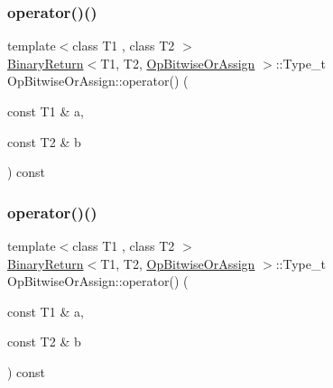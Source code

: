 \subsubsection{\texorpdfstring{operator()()}{operator()()}\hspace{0.1cm}{\footnotesize\ttfamily [1/3]}}
{\footnotesize\ttfamily template$<$class T1 , class T2 $>$ \\
\mbox{\hyperlink{structBinaryReturn}{Binary\+Return}}$<$T1, T2, \mbox{\hyperlink{structOpBitwiseOrAssign}{Op\+Bitwise\+Or\+Assign}} $>$\+::Type\+\_\+t Op\+Bitwise\+Or\+Assign\+::operator() (\begin{DoxyParamCaption}\item[{const T1 \&}]{a,  }\item[{const T2 \&}]{b }\end{DoxyParamCaption}) const\hspace{0.3cm}{\ttfamily [inline]}}

\mbox{\label{structOpBitwiseOrAssign_abdf5c9f46dce33611878cf271e3b7a09}} 
\subsubsection{\texorpdfstring{operator()()}{operator()()}\hspace{0.1cm}{\footnotesize\ttfamily [2/3]}}
{\footnotesize\ttfamily template$<$class T1 , class T2 $>$ \\
\mbox{\hyperlink{structBinaryReturn}{Binary\+Return}}$<$T1, T2, \mbox{\hyperlink{structOpBitwiseOrAssign}{Op\+Bitwise\+Or\+Assign}} $>$\+::Type\+\_\+t Op\+Bitwise\+Or\+Assign\+::operator() (\begin{DoxyParamCaption}\item[{const T1 \&}]{a,  }\item[{const T2 \&}]{b }\end{DoxyParamCaption}) const\hspace{0.3cm}{\ttfamily [inline]}}

\mbox{\label{structOpBitwiseOrAssign_abdf5c9f46dce33611878cf271e3b7a09}} 

